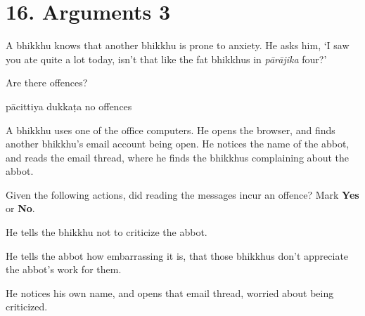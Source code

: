 \chapter{16. Arguments 3}
\renewcommand*{\theChapterTitle}{16. Arguments 3}

\begin{exam}{\autoExamName}

  \begin{problem}

    A bhikkhu knows that another bhikkhu is prone to anxiety. He asks him, `I
    saw you ate quite a lot today, isn't that like the fat bhikkhus in
    \textit{pārājika} four?'

    Are there offences?

    \begin{answers}{3}
      \bChoices
       pācittiya\eAns
       dukkaṭa\eAns
       no offences\eAns
      \eChoices
    \end{answers}

  \end{problem}

  \problemDivide

  \begin{problem*}

    A bhikkhu uses one of the office computers. He opens the browser, and finds
    another bhikkhu's email account being open. He notices the name of the
    abbot, and reads the email thread, where he finds the bhikkhus complaining
    about the abbot.

    \bigskip

    Given the following actions, did reading the messages incur an offence? Mark \textbf{Yes} or \textbf{No}.

    \bigskip

      \begin{parts}
      \item {} He tells the bhikkhu not to criticize the abbot.

      \item {} He tells the abbot how embarrassing it is, that those
        bhikkhus don't appreciate the abbot's work for them.
        
      \item {} He notices his own name, and opens that email thread, worried
        about being criticized.
      \end{parts}

  \end{problem*}


\end{exam}
